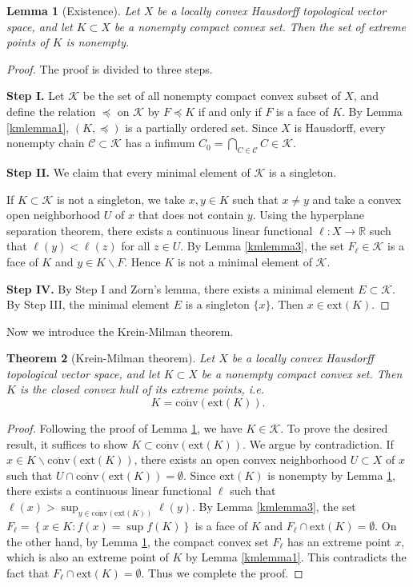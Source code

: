 \documentclass{article}
\numberwithin{equation}{section}
\newcommand{\bbR}{\mathbb{R}}
\newcommand{\scr}{\mathscr}
\newcommand{\ol}{\overline}
\theoremstyle{plain}
\newtheorem{theorem}{Theorem}[section]
\newtheorem{lemma}[theorem]{Lemma}
\theoremstyle{definition}
\begin{document}
\begin{lemma}[Existence]\label{kmlemma2}
Let $X$ be a locally convex Hausdorff topological vector space, and let $K\subset X$ be a nonempty compact convex set. Then the set of extreme points of $K$ is nonempty.
\end{lemma}
\begin{proof}
The proof is divided to three steps.
\item \textbf{Step I.} Let $\scr{K}$ be the set of all nonempty compact convex subset of $X$, and define the relation $\preceq$ on $\scr{K}$ by $F\preceq K$ if and only if $F$ is a face of $K$. By Lemma \ref{kmlemma1}, $(K,\preceq)$ is a partially ordered set. Since $X$ is Hausdorff, every nonempty chain $\scr{C}\subset\scr{K}$ has a infimum $C_0=\bigcap_{C\in\scr{C}}C\in\mathscr{K}$.
\item \textbf{Step II.} We claim that every minimal element of $\scr{K}$ is a singleton. 

If $K\subset\scr{K}$ is not a singleton, we take $x,y\in K$ such that $x\neq y$ and take a convex open neighborhood $U$ of $x$ that does not contain $y$. Using the hyperplane separation theorem, there exists a continuous linear functional $\ell:X\to\bbR$ such that $\ell(y)<\ell(z)$ for all $z\in U$. By Lemma \ref{kmlemma3}, the set $F_\ell\in\scr{K}$ is a face of $K$ and $y\in K\backslash F$. Hence $K$ is not a minimal element of $\scr{K}$.

\item \textbf{Step IV.} By Step I and Zorn's lemma, there exists a minimal element $E\subset\scr{K}$. By Step III, the minimal element $E$ is a singleton $\{x\}$. Then $x\in\mathrm{ext}(K)$.
\end{proof}

Now we introduce the Krein-Milman theorem.
\begin{theorem}[Krein-Milman theorem]
	Let $X$ be a locally convex Hausdorff topological vector space, and let $K\subset X$ be a nonempty compact convex set. Then $K$ is the closed convex hull of its extreme points, i.e. $$K=\ol{\mathrm{conv}}(\mathrm{ext}(K)).$$
\end{theorem}
\begin{proof}
Following the proof of Lemma \ref{kmlemma2}, we have $K\in\scr{K}$. To prove the desired result, it suffices to show $K\subset\ol{\mathrm{conv}}(\mathrm{ext}(K))$. We argue by contradiction. If  $x\in K\backslash\ol{\mathrm{conv}}(\mathrm{ext}(K))$, there exists an open convex neighborhood $U\subset X$ of $x$ such that $U\cap \ol{\mathrm{conv}}(\mathrm{ext}(K))=\emptyset$. Since $\mathrm{ext}(K)$ is nonempty by Lemma \ref{kmlemma2}, there exists a continuous linear functional $\ell$ such that $\ell(x)>\sup_{y\in\ol{\mathrm{conv}}(\mathrm{ext}(K))} \ell(y)$.  By Lemma \ref{kmlemma3}, the set $F_\ell=\left\{x\in K:f(x)=\sup f(K)\right\}$ is a face of $K$ and $F_\ell\cap\mathrm{ext}(K)=\emptyset$. On the other hand, by Lemma \ref{kmlemma2}, the compact convex set $F_\ell$ has an extreme point $x$, which is also an extreme point of $K$ by Lemma \ref{kmlemma1}. This contradicts the fact that $F_\ell\cap\mathrm{ext}(K)=\emptyset$. Thus we complete the proof.
\end{proof}
\end{document}
